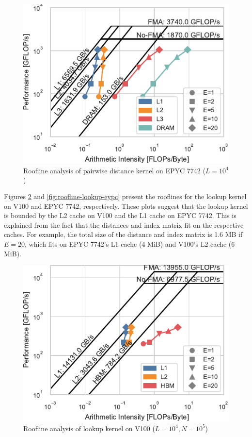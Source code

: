 \documentclass[sigconf]{acmart}
\begin{document}
\begin{figure}
    \centering
    \includegraphics[width=.9\linewidth]{figs/roofline_distances_epyc}
    \caption{Roofline analysis of pairwise distance kernel on EPYC 7742 ($L=10^4$)}%
    \label{fig:roofline-distances-epyc}
\end{figure}

Figures \ref{fig:roofline-lookup-v100} and \ref{fig:roofline-lookup-eypc} present
the rooflines for the lookup kernel on V100 and EPYC 7742, respectively. These
plots suggest that the lookup kernel is bounded by the L2 cache on V100 and
the L1 cache on EPYC 7742. This is explained from the fact that the distances
and index matrix fit on the respective caches. For example, the total size of
the distance and index matrix is 1.6 MB if $E=20$, which fits on EPYC 7742's L1
cache (4 MiB) and V100's L2 cache (6 MiB).

\begin{figure}
    \centering
    \includegraphics[width=.9\linewidth]{figs/roofline_lookup_wo_rho_v100}
    \caption{Roofline analysis of lookup kernel on V100 ($L=10^4, N=10^5$)}%
    \label{fig:roofline-lookup-v100}
\end{figure}
\end{document}
